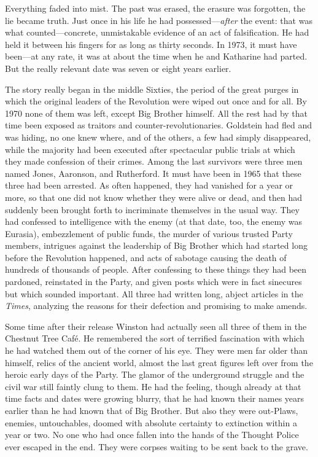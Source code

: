 Everything faded into mist. The past was erased, the erasure was
forgotten, the lie became truth. Just once in his life he had
possessed---\emph{after} the event: that was what counted---concrete,
unmistakable evidence of an act of falsification. He had held it between
his fingers for as long as thirty seconds. In 1973, it must have
been---at any rate, it was at about the time when he and Katharine had
parted. But the really relevant date was seven or eight years earlier.

The story really began in the middle Sixties, the period of the great
purges in which the original leaders of the Revolution were wiped out
once and for all. By 1970 none of them was left, except Big Brother
himself. All the rest had by that time been exposed as traitors and
counter-revolutionaries. Goldstein had fled and was hiding, no one knew
where, and of the others, a few had simply disappeared, while the
majority had been executed after spectacular public trials at which they
made confession of their crimes. Among the last survivors were three men
named Jones, Aaronson, and Rutherford. It must have been in 1965 that
these three had been arrested. As often happened, they had vanished for
a year or more, so that one did not know whether they were alive or
dead, and then had suddenly been brought forth to incriminate themselves
in the usual way. They had confessed to intelligence with the enemy (at
that date, too, the enemy was Eurasia), embezzlement of public funds,
the murder of various trusted Party members, intrigues against the
leadership of Big Brother which had started long before the Revolution
happened, and acts of sabotage causing the death of hundreds of
thousands of people. After confessing to these things they had been
pardoned, reinstated in the Party, and given posts which were in fact
sinecures but which sounded important. All three had written long,
abject articles in the \emph{Times}, analyzing the reasons for their
defection and promising to make amends.

Some time after their release Winston had actually seen all three of
them in the Chestnut Tree Café. He remembered the sort of terrified
fascination with which he had watched them out of the corner of his eye.
They were men far older than himself, relics of the ancient world,
almost the last great figures left over from the heroic early days of
the Party. The glamor of the underground struggle and the civil war
still faintly clung to them. He had the feeling, though already at that
time facts and dates were growing blurry, that he had known their names
years earlier than he had known that of Big Brother. But also they were
out-Plaws, enemies, untouchables, doomed with absolute certainty to
extinction within a year or two. No one who had once fallen into the
hands of the Thought Police ever escaped in the end. They were corpses
waiting to be sent back to the grave.

